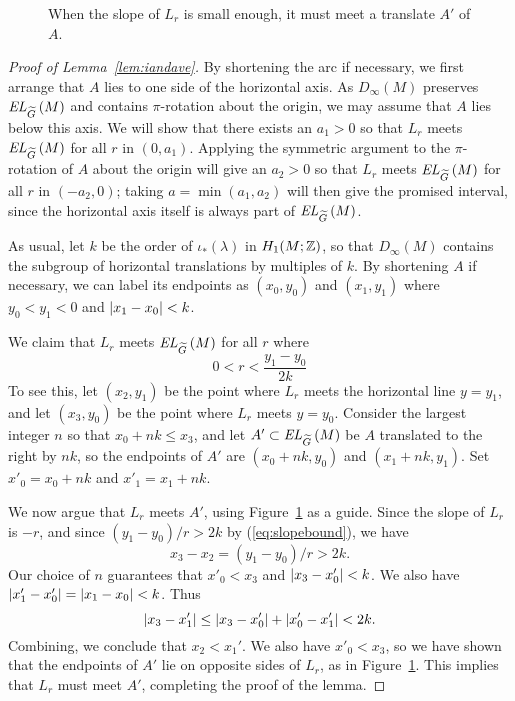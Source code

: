 \documentclass[tikz, sepfignums, defaultenums]{nmd/article}
\newcommand{\TEL}[1]{\mathit{EL}_\Gtil\left(#1\right)}
\newcommand{\SymTEL}[1]{D_\infty\left(#1\right)}
\begin{document}
\begin{figure}
  \begin{center}
    
  \end{center}
  \caption{When the slope of $L_r$ is small enough, it must meet a
    translate $A'$ of $A$.}
  \label{fig:Aprime}
\end{figure}

\begin{proof}[Proof of Lemma~\ref{lem:iandave}]
By shortening the arc if necessary, we first arrange that $A$ lies to
one side of the horizontal axis.  As $\SymTEL{M}$ preserves $\TEL{M}$
and contains $\pi$-rotation about the origin, we may assume that $A$
lies below this axis.  We will show that there exists an $a_1 > 0$ so
that $L_r$ meets $\TEL{M}$ for all $r$ in $(0, a_1)$.  Applying the
symmetric argument to the $\pi$-rotation of $A$ about the origin will
give an $a_2 > 0$ so that $L_r$ meets $\TEL{M}$ for all $r$ in
$(-a_2, 0)$; taking $a = \min(a_1, a_2)$ will then give the promised
interval, since the horizontal axis itself is always part of $\TEL{M}$.

As usual, let $k$ be the order of $\iota_*(\lambda)$ in $H_1(M; {\mathbb Z})$,
so that $\SymTEL{M}$ contains the subgroup of horizontal
translations by multiples of $k$. By shortening $A$ if necessary, we
can label its endpoints as $(x_0, y_0)$ and $(x_1, y_1)$ where
$y_0 < y_1 < 0$ and ${\left| x_1 - x_0 \right|} < k$.

We claim that $L_r$ meets $\TEL{M}$ for all $r$ where
\begin{equation}\label{eq:slopebound}
0 < r < \frac{y_1 - y_0}{2k}
\end{equation}
To see this, let $(x_2, y_1)$ be the point where $L_r$ meets the horizontal line
$y = y_1$, and let $(x_3, y_0)$ be the point where $L_r$ meets $y =
y_0$.  Consider the largest integer $n$ so that $x_0 + n k \leq x_3$, and 
let $A' \subset \TEL{M}$ be $A$ translated to the right by $n k$, so
the endpoints of $A'$ are $(x_0 + nk, y_0)$ and $(x_1 + nk, y_1)$.
Set $x'_0 = x_0 + nk$ and $x'_1 = x_1 + nk$.

We now argue that $L_r$ meets $A'$, using Figure~\ref{fig:Aprime} as a
guide.  Since the slope of $L_r$ is $-r$, and since $(y_1 - y_0)/r > 2 k$ by
(\ref{eq:slopebound}), we have $$x_3 - x_2 = (y_1 - y_0)/r > 2 k.$$
Our choice of $n$ guarantees that $x'_0 < x_3$ and ${\left| x_3 - x'_0 \right|}  < k$.
We also have ${\left| x_1' - x_0' \right|} = {\left| x_1 - x_0 \right|} < k$.  Thus
\[
{\left| x_3 - x_1' \right|} \leq {\left| x_3 - x_0' \right|} + {\left| x_0' - x_1' \right|} < 2 k.
\]
Combining, we conclude that $x_2 < x_1'$.  We also have $x'_0 < x_3$,
so we have shown that the endpoints of $A'$ lie on opposite sides of
$L_r$, as in Figure~\ref{fig:Aprime}.  This implies that $L_r$ must
meet $A'$, completing the proof of the lemma.
\end{proof}
\end{document}

